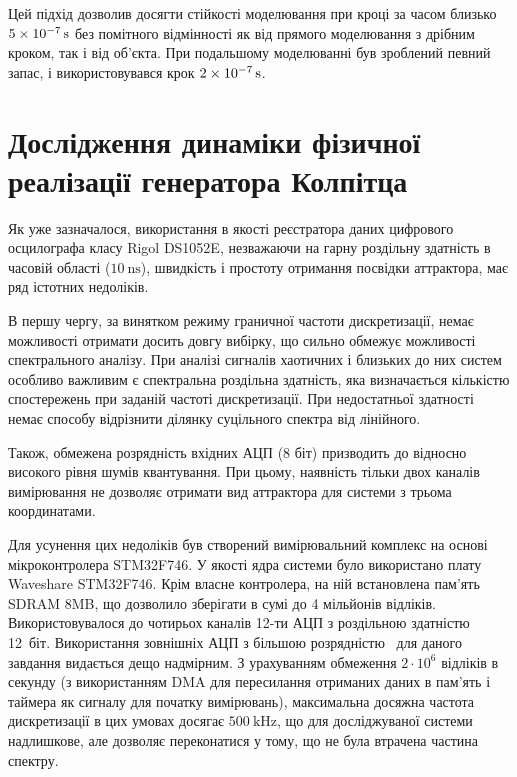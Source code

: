 Цей підхід дозволив досягти стійкості моделювання при кроці
за часом близько
$\SI{5E-7}{\second} $ без помітного відмінності як від прямого
моделювання з дрібним кроком, так і від об'єкта. При подальшому
моделюванні був зроблений певний запас, і використовувався крок
$\SI{2E-7}{\second} $.




\section{Дослідження динаміки фізичної реалізації генератора Колпітца} %

Як уже зазначалося, використання в якості реєстратора даних
цифрового осцилографа класу Rigol DS1052E, незважаючи на гарну роздільну здатність
в часовій області ($ \SI{10}{\nano \second} $), швидкість і простоту отримання посвідки
аттрактора, має ряд істотних недоліків.

В першу чергу, за винятком режиму граничної частоти
дискретизації, немає можливості отримати досить довгу вибірку,
що сильно обмежує можливості спектрального аналізу. При аналізі
сигналів хаотичних і близьких до них систем особливо важливим
є спектральна роздільна здатність, яка визначається кількістю спостережень
при заданій частоті дискретизації. При недостатньої здатності
немає способу відрізнити ділянку суцільного спектра від
лінійного.

Також, обмежена розрядність вхідних АЦП (8 біт) призводить до
відносно високого рівня шумів квантування. При цьому, наявність
тільки двох каналів вимірювання не дозволяє отримати вид
аттрактора для системи з трьома координатами.

Для усунення цих недоліків був створений вимірювальний
комплекс на основі мікроконтролера STM32F746. У якості ядра системи було використано
плату Waveshare STM32F746. Крім власне контролера, на ній
встановлена пам'ять SDRAM 8MB, що дозволило зберігати
в сумі до 4 мільйонів відліків. Використовувалося до чотирьох
каналів 12-ти АЦП з роздільною здатністю 12~біт. Використання
зовнішніх АЦП з більшою розрядністю~\cite{atu_st104a} для даного
завдання видається дещо надмірним. З урахуванням обмеження
$2 \cdot 10 ^ 6 $ відліків в секунду (з використанням DMA для пересилання
отриманих даних в пам'ять і таймера як сигналу для початку
вимірювань), максимальна досяжна частота дискретизації в цих
умовах досягає
$\SI{500}{\kilo \hertz} $, що для досліджуваної системи надлишкове,
але дозволяє переконатися у тому, що не була втрачена частина
спектру.

